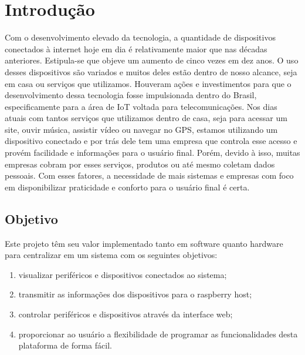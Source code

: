 \documentclass[../../layout.tex]{subfiles}
\begin{document}
\chapter{Introdução}
\hspace*{3em}Com o desenvolvimento elevado da tecnologia, a quantidade de dispositivos conectados à internet hoje em dia é relativamente maior que nas décadas anteriores. Estipula-se que objeve um aumento de cinco vezes em dez anos\cite{conectdevicesnum}. O uso desses dispositivos são variados e muitos deles estão dentro de nosso alcance, seja em casa ou serviços que utilizamos. Houveram ações e investimentos para que o desenvolvimento dessa tecnologia fosse impulsionada dentro do Brasil, especificamente para a área de IoT voltada para telecomunicações\cite{iotinvest}. Nos dias atuais com tantos serviços que utilizamos dentro de casa, seja para acessar um site, ouvir música, assistir vídeo ou navegar no GPS, estamos utilizando um dispositivo conectado e por trás dele tem uma empresa que controla esse acesso e provém facilidade e informações para o usuário final. Porém, devido à isso, muitas empresas cobram por esses serviços, produtos ou até mesmo coletam dados pessoais. Com esses fatores, a necessidade de mais sistemas e empresas com foco em disponibilizar praticidade e conforto para o usuário final é certa.

\section{Objetivo}
\hspace*{3em}Este projeto têm seu valor implementado tanto em software quanto hardware para centralizar em um sistema com os seguintes objetivos:
\begin{enumerate}[label=\alph*)]
\itemsep0em
\item visualizar periféricos e dispositivos conectados ao sistema;
\item transmitir as informações dos dispositivos para o raspberry host;
\item controlar periféricos e dispositivos através da interface web;
\item proporcionar ao usuário a flexibilidade de programar as funcionalidades desta plataforma de forma fácil.
\end{enumerate}
\end{document}
